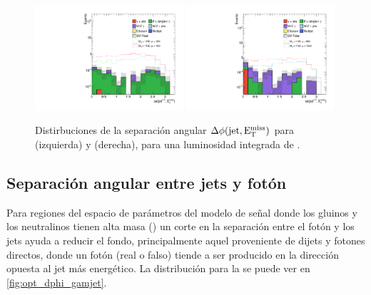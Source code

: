 \begin{figure}[!htbp]
  \centering

  \includegraphics[width=0.49\textwidth]{figures/dphi_jetmet_srl}
  \includegraphics[width=0.49\textwidth]{figures/dphi_jetmet_srh}

  \caption{Distirbuciones de la separación angular $\Delta \phi \mathrm{(jet, E_{\mathrm{T}}^{\mathrm{miss}})}$ para {\SRL} (izquierda) y {\SRH} (derecha),
  para una luminosidad integrada de {\ilumi}.}
  \label{fig:opt_dphi_jetmet}
\end{figure}


\subsection{Separación angular entre jets y fotón}

Para regiones del espacio de parámetros del modelo de señal
donde los gluinos y los neutralinos tienen alta masa ({\SRH})
un corte en la separación entre el fotón y los jets ayuda a
reducir el fondo, principalmente aquel proveniente de dijets y
fotones directos, donde un fotón (real o falso) tiende a ser
producido en la dirección opuesta al jet más energético.
La distribución para la {\SRH} se puede ver en \cref{fig:opt_dphi_gamjet}.


%


